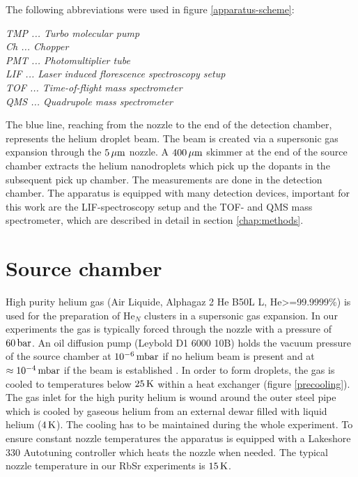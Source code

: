 \documentclass[parskip,12pt,headsepline,a4paper] {scrbook}
\begin{document}
The following abbreviations were used in figure \ref{apparatus-scheme}:

\textit{TMP ... Turbo molecular pump} \\
\textit{Ch  ... Chopper} \\
\textit{PMT ... Photomultiplier tube} \\
\textit{LIF ... Laser induced florescence spectroscopy setup} \\
\textit{TOF ... Time-of-flight mass spectrometer} \\
\textit{QMS ... Quadrupole mass spectrometer}

The blue line, reaching from the nozzle to the end of the detection chamber, represents the helium droplet beam. The beam is created via a supersonic gas expansion through the $\unit[5]{\mu m}$ nozzle. A $\unit[400]{\mu m}$ skimmer at the end of the source chamber extracts the helium nanodroplets which pick up the dopants in the subsequent pick up chamber. The measurements are done in the detection chamber. The apparatus is equipped with many detection devices, important for this work are the LIF-spectroscopy setup and the TOF- and QMS mass spectrometer, which are described in detail in section \ref{chap:methods}.


\section{Source chamber}
\vspace{-1\baselineskip}
High purity helium gas (Air Liquide, Alphagaz 2 He B50L L, He>=99.9999\%) is used for the preparation of He$_N$ clusters in a supersonic gas expansion. In our experiments the gas is typically forced through the nozzle with a pressure of $\unit[60]{bar}$. An oil diffusion pump (Leybold D1 6000 10B) holds the vacuum pressure of the source chamber at $\unit[10^{-6}]{mbar}$ if no helium beam is present and at $\approx \unit[10^{-4}]{mbar}$ if the beam is established \cite{krois}. In order to form droplets, the gas is cooled to temperatures below $\unit[25]{K}$ within a heat exchanger (figure \ref{precooling}). The gas inlet for the high purity helium is wound around the outer steel pipe which is cooled by gaseous helium from an external dewar filled with liquid helium ($\unit[4]{K}$). The cooling has to be maintained during the whole experiment. To ensure constant nozzle temperatures the apparatus is equipped with a Lakeshore 330 Autotuning controller which heats the nozzle when needed. The typical nozzle temperature in our RbSr experiments is $\unit[15]{K}$.
\end{document}
